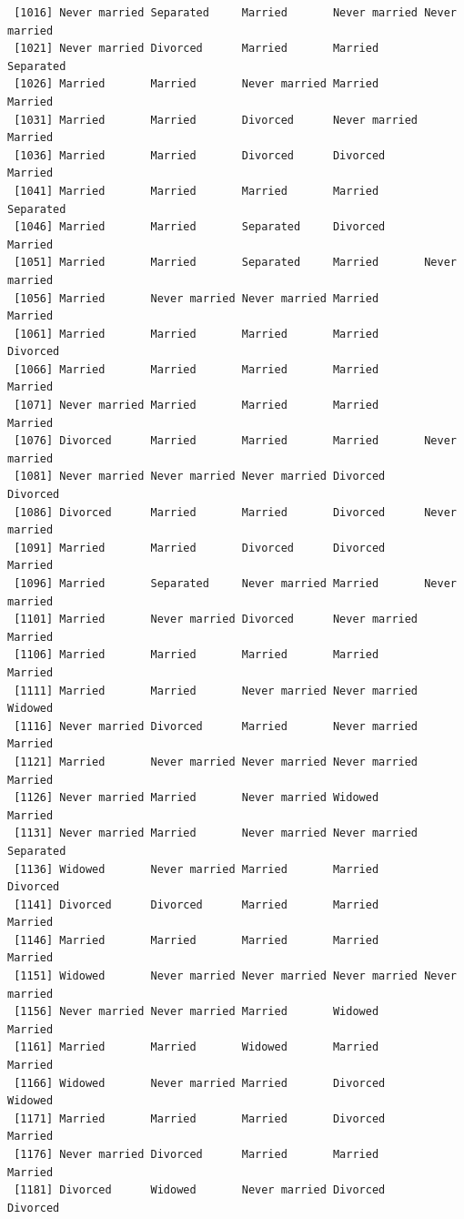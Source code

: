 \documentclass[
  letterpaper,
  DIV=11,
  numbers=noendperiod,
  oneside]{scrartcl}
\begin{document}
\begin{verbatim}
 [1016] Never married Separated     Married       Never married Never married
 [1021] Never married Divorced      Married       Married       Separated    
 [1026] Married       Married       Never married Married       Married      
 [1031] Married       Married       Divorced      Never married Married      
 [1036] Married       Married       Divorced      Divorced      Married      
 [1041] Married       Married       Married       Married       Separated    
 [1046] Married       Married       Separated     Divorced      Married      
 [1051] Married       Married       Separated     Married       Never married
 [1056] Married       Never married Never married Married       Married      
 [1061] Married       Married       Married       Married       Divorced     
 [1066] Married       Married       Married       Married       Married      
 [1071] Never married Married       Married       Married       Married      
 [1076] Divorced      Married       Married       Married       Never married
 [1081] Never married Never married Never married Divorced      Divorced     
 [1086] Divorced      Married       Married       Divorced      Never married
 [1091] Married       Married       Divorced      Divorced      Married      
 [1096] Married       Separated     Never married Married       Never married
 [1101] Married       Never married Divorced      Never married Married      
 [1106] Married       Married       Married       Married       Married      
 [1111] Married       Married       Never married Never married Widowed      
 [1116] Never married Divorced      Married       Never married Married      
 [1121] Married       Never married Never married Never married Married      
 [1126] Never married Married       Never married Widowed       Married      
 [1131] Never married Married       Never married Never married Separated    
 [1136] Widowed       Never married Married       Married       Divorced     
 [1141] Divorced      Divorced      Married       Married       Married      
 [1146] Married       Married       Married       Married       Married      
 [1151] Widowed       Never married Never married Never married Never married
 [1156] Never married Never married Married       Widowed       Married      
 [1161] Married       Married       Widowed       Married       Married      
 [1166] Widowed       Never married Married       Divorced      Widowed      
 [1171] Married       Married       Married       Divorced      Married      
 [1176] Never married Divorced      Married       Married       Married      
 [1181] Divorced      Widowed       Never married Divorced      Divorced     

\end{verbatim}
\end{document}
